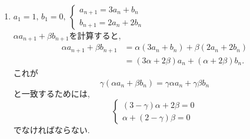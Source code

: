 \begin{enumerate}[label=(\arabic*),parsep=3pt]
\begin{enumerate}
                2式を辺々加えると,
                \[
                  2a_n=2\cdot4^{n-1}
                \]
                であるから,
                \[
                  a_n=4^{n-1}.
                \]
                また,
                \[
                  b_n=a_n=4^{n-1}.
                \]
          \item 【解法2】\\
                2つの式を辺々加えると,
                \begin{align*}
                  a_{n+1}+b_{n+1}
                   & =(3a_n+b_n)+(a_n+3b_n) \\
                   & =4(a_n+b_n).
                \end{align*}
                よって,
                \[
                  a_n+b_n=(a_1+b_1)4^{n-1}=2\cdot4^{n-1}. \tag{1}
                \]

                また,2つの式を辺々引くと,
                \begin{align*}
                  a_{n+1}-b_{n+1}
                   & =(3a_n+b_n)-(a_n+3b_n) \\
                   & =2(a_n-b_n).
                \end{align*}
                よって,
                \[
                  a_n-b_n=(a_1-b_1)2^{n-1}=0. \tag{2}
                \]

                \((1)+(2)\)をすると,
                \[
                  2a_n=2\cdot4^{n-1}
                \]
                なので,
                \[
                  a_n=4^{n-1}.
                \]

                また,\((1)-(2)\)をすると,
                \[
                  2b_n=2\cdot4^{n-1}
                \]
                なので,
                \[
                  b_n=4^{n-1}.
                \]
        \end{enumerate}
  \item $\displaystyle a_1=1,\,b_1=0,\ \begin{cases}a_{n+1}=3a_n+b_n\\ b_{n+1}=2a_n+2b_n\end{cases}$\\
        $\alpha a_{n+1}+\beta b_{n+1}$を計算すると,
        \begin{align*}
          \alpha a_{n+1}+\beta b_{n+1}
           & =\alpha(3a_n+b_n)+\beta(2a_n+2b_n)       \\
           & =(3\alpha+2\beta)a_n+(\alpha+2\beta)b_n.
        \end{align*}
        これが
        \[
          \gamma(\alpha a_n+\beta b_n)
          =\gamma\alpha a_n+\gamma\beta b_n
        \]
        と一致するためには,
        \[
          \begin{cases}
            (3-\gamma)\alpha+2\beta=0 \\
            \alpha+(2-\gamma)\beta=0
          \end{cases}
        \]
        でなければならない.


\end{enumerate}
